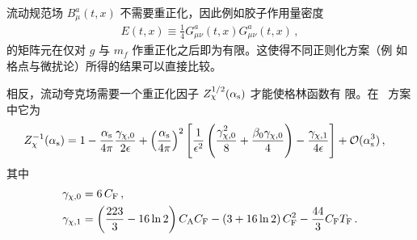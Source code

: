 流动规范场 $B^a_\mu(t,x)$ 不需要重正化，因此例如胶子作用量密度
\begin{align}
  E (t,x) \equiv \frac{1}{4} G_{\mu \nu}^a(t,x) G_{\mu \nu}^a(t,x)\,,
  \label{eq:def_E}
\end{align}
的矩阵元在仅对 $g$ 与 $m_f$ 作重正化之后即为有限。这使得不同正则化方案（例
如格点与微扰论）所得的结果可以直接比较。

相反，流动夸克场需要一个重正化因子 $Z_\chi^{1/2}(\alpha_\mathrm{s})$ 才能使格林函数有
限。在 \msbar\ 方案中它为\,\cite{Luscher:2010iy,Harlander:2018zpi}
\begin{equation}
  \begin{split}
        Z^{-1}_\chi(\alpha_\mathrm{s}) &= 1
        -\frac{\alpha_\mathrm{s}}{4\pi}\frac{\gamma_{\chi,0}}{2\epsilon}
        +\left(\frac{\alpha_\mathrm{s}}{4\pi}\right)^2\left[\frac{1}{\epsilon^2}\left(
          \frac{\gamma_{\chi,0}^2}{8} +
          \frac{\beta_0\gamma_{\chi,0}}{4}\right)
          -\frac{\gamma_{\chi,1}}{4\epsilon}\right] + {\cal O}(\alpha_\mathrm{s}^3)\,,
  \end{split}
\end{equation}
其中
\begin{equation}
  \begin{split}
  \gamma_{\chi,0} &= 6\,C_\mathrm{F}\,,\\
  \gamma_{\chi, 1} &=
  \left( \frac{223}{3} - 16 \ln 2 \right) C_\mathrm{A} C_\mathrm{F} - \left( 3 + 16
  \ln 2 \right) C_\mathrm{F}^2 - \frac{44}{3} C_\mathrm{F} T_\mathrm{F}\,.
  \end{split}
\end{equation}

